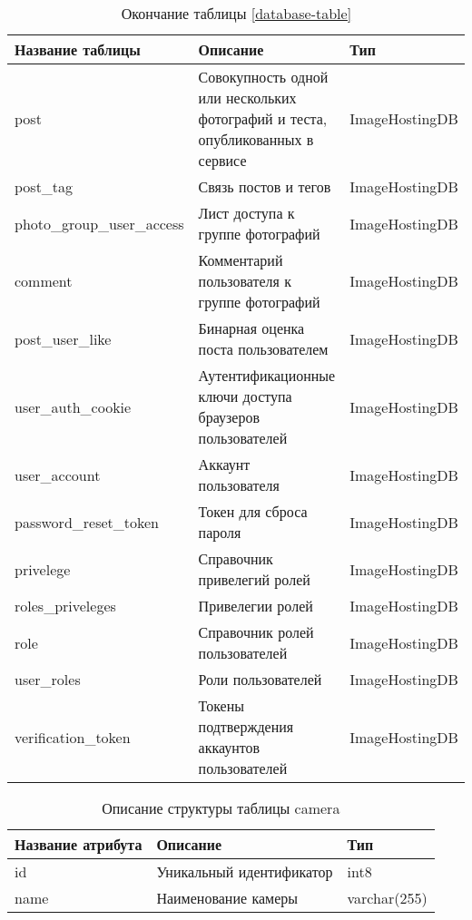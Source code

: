 \begin{table}[H]
  \caption*{\onehalfspacing Окончание таблицы \ref{database-table}}
  \begin{tabular}{|p{6cm}|p{6cm}|p{4cm}|}
  \hline Название таблицы & Описание & Тип \\
  \hline post & Совокупность одной или нескольких фотографий и теста, опубликованных в сервисе  & ImageHostingDB \\
  \hline post_tag & Связь постов и тегов & ImageHostingDB \\
  \hline photo_group_user_access & Лист доступа к группе фотографий & ImageHostingDB \\
  \hline comment & Комментарий пользователя к группе фотографий & ImageHostingDB \\
  \hline post_user_like & Бинарная оценка поста пользователем & ImageHostingDB \\
  \hline user_auth_cookie & Аутентификационные ключи доступа браузеров пользователей & ImageHostingDB \\
  \hline user_account & Аккаунт пользователя & ImageHostingDB \\
  \hline password_reset_token & Токен для сброса пароля & ImageHostingDB \\
  \hline privelege & Справочник привелегий ролей & ImageHostingDB \\
  \hline roles_priveleges & Привелегии ролей & ImageHostingDB \\
  \hline role & Справочник ролей пользователей & ImageHostingDB \\
  \hline user_roles & Роли пользователей & ImageHostingDB \\
  \hline verification_token & Токены подтверждения аккаунтов пользователей & ImageHostingDB \\
  \hline
  \end{tabular}
\end{table}


\begin{table}[H]
  \caption{\onehalfspacing Описание структуры таблицы camera}\label{database-table-camera}
  \begin{tabular}{|p{6cm}|p{6cm}|p{4cm}|}
  \hline Название атрибута & Описание & Тип \\
  \hline id & Уникальный идентификатор & int8 \\
  \hline name & Наименование камеры & varchar(255) \\
  \hline
  \end{tabular}
\end{table}

